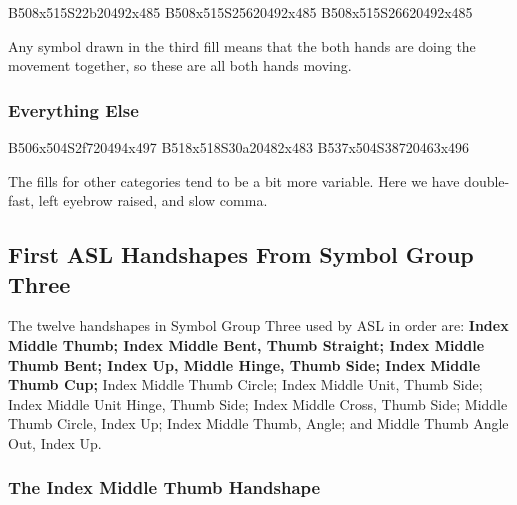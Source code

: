\documentclass{article}
\begin{document}
\begin{center}
B508x515S22b20492x485 B508x515S25620492x485 B508x515S26620492x485
\end{center}

Any symbol drawn in the third fill means that the both hands are doing the movement together, so these are all both hands moving.

\subsubsection{Everything Else}

\begin{center}
B506x504S2f720494x497 B518x518S30a20482x483 B537x504S38720463x496
\end{center}

The fills for other categories tend to be a bit more variable.
Here we have double-fast, left eyebrow raised, and slow comma.

\subsection{First ASL Handshapes From Symbol Group Three}

The twelve handshapes in Symbol Group Three used by ASL in order are:
{\bf
Index Middle Thumb;
Index Middle Bent, Thumb Straight;
Index Middle Thumb Bent;
Index Up, Middle Hinge, Thumb Side;
Index Middle Thumb Cup;
}
Index Middle Thumb Circle;
Index Middle Unit, Thumb Side;
Index Middle Unit Hinge, Thumb Side;
Index Middle Cross, Thumb Side;
Middle Thumb Circle, Index Up;
Index Middle Thumb, Angle;
and Middle Thumb Angle Out, Index Up.

\subsubsection{The Index Middle Thumb Handshape}
\end{document}
